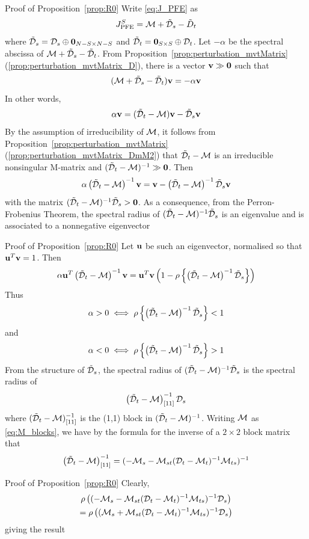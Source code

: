 \documentclass[aspectratio=169]{beamer}
\begin{document}
\begin{frame}{Proof of Proposition~\ref{prop:R0}}
		Write \eqref{eq:J_PFE} as
		\[
		J_{\textrm{PFE}}^S=\mathcal{M}+\tilde{\mathcal{D}}_s-\tilde D_t
		\]
		where $\tilde\D_s=\D_s\oplus\b0_{N-S\times N-S}$ and $\tilde \D_t=\b0_{S\times S}\oplus\D_t$.
		Let $-\alpha$ be the spectral abscissa of $\mathcal{M}+\tilde{\mathcal{D}}_s-\tilde{\mathcal{D}}_t$. 
		From Proposition~\ref{prop:perturbation_mvtMatrix}(\ref{prop:perturbation_mvtMatrix_D}), there is a vector $\bv\gg \b0$ such that
		\[
		(\mathcal{M}+\tilde{\mathcal{D}}_s-\tilde{\mathcal{D}}_t)\mathbf{v} = -\alpha\mathbf{v}
		\]
		In other words,
		\[
		\alpha\mathbf{v} = (\tilde{\mathcal{D}}_t-\mathcal{M})\mathbf{v}-\tilde{\mathcal{D}}_s\mathbf{v}
		\]
		By the assumption of irreducibility of $\mathcal{M}$, it follows from Proposition~\ref{prop:perturbation_mvtMatrix}(\ref{prop:perturbation_mvtMatrix_DmM2}) that $\tilde{\mathcal{D}}_t-\mathcal{M}$ is an irreducible nonsingular M-matrix and $(\tilde\D_t-\M)^{-1}\gg\b0$.
		Then
		\[
		\alpha\left(
		\tilde{\mathcal{D}}_t-\mathcal{M}
		\right)^{-1}\mathbf{v}
		=\mathbf{v} -\left(
		\tilde{\mathcal{D}}_t-\mathcal{M}
		\right)^{-1}
		\tilde{\mathcal{D}}_s\mathbf{v}
		\]
		with the matrix $(\tilde\D_t-\M)^{-1}\tilde\D_s>\b0$. As a consequence, from the Perron-Frobenius Theorem, the spectral radius of $(\tilde{\mathcal{D}}_t-\mathcal{M})^{-1}\tilde{\mathcal{D}}_s$ is an eigenvalue and is associated to a nonnegative eigenvector
\end{frame}
		
\begin{frame}{Proof of Proposition~\ref{prop:R0}}
		Let $\mathbf{u}$ be such an eigenvector, normalised so that $\mathbf{u}^T\mathbf{v}=1$.
		Then
		\[
		\alpha\mathbf{u}^T
		\left(\tilde{\mathcal{D}}_t-\mathcal{M}\right)^{-1}\mathbf{v} =
		\mathbf{u}^T\mathbf{v}
		\left(1-
		\rho\left\{\left(\tilde{\mathcal{D}}_t-\mathcal{M}\right)^{-1}\tilde{\mathcal{D}}_s\right\}
		\right)
		\]
		Thus
		\[
		\alpha>0 \iff \rho\left\{\left(\tilde{\mathcal{D}}_t-\mathcal{M}\right)^{-1}\tilde{\mathcal{D}}_s\right\} <1
		\]
		and
		\[
		\alpha<0 \iff \rho\left\{\left(\tilde{\mathcal{D}}_t-\mathcal{M}\right)^{-1}\tilde{\mathcal{D}}_s\right\} >1
		\]
		From the structure of $\tilde{\mathcal{D}}_s$, the spectral radius of $(\tilde{\mathcal{D}}_t-\mathcal{M})^{-1}\tilde{\mathcal{D}}_s$ is the spectral radius of 
		\[
		\left(\tilde{\mathcal{D}}_t-\mathcal{M}\right)^{-1}_{[11]}\mathcal{D}_s
		\]
		where $(\tilde{\mathcal{D}}_t-\mathcal{M})^{-1}_{[11]}$ is the (1,1) block in $(\tilde{\mathcal{D}}_t-\mathcal{M})^{-1}$.
		Writing $\mathcal{M}$ as \eqref{eq:M_blocks}, we have by the formula for the inverse of a $2\times 2$ block matrix that 
		\[
		\left(\tilde{\mathcal{D}}_t-\mathcal{M}\right)^{-1}_{[11]}=(-\mathcal{M}_s-\mathcal{M}_{st}(\mathcal{D}_t-\mathcal{M}_t)^{-1}\mathcal{M}_{ts})^{-1}
		\]
\end{frame}

\begin{frame}{Proof of Proposition~\ref{prop:R0}}
		Clearly,
		\begin{multline*}
			\rho\left(
			(-\mathcal{M}_s-\mathcal{M}_{st}(\mathcal{D}_t-\mathcal{M}_t)^{-1}\mathcal{M}_{ts})^{-1}\mathcal{D}_s
			\right) \\
			=
			\rho\left(
			(\mathcal{M}_s+\mathcal{M}_{st}(\mathcal{D}_t-\mathcal{M}_t)^{-1}\mathcal{M}_{ts})^{-1}\mathcal{D}_s
			\right)
		\end{multline*}
		giving the result
\end{frame}
\end{document}
